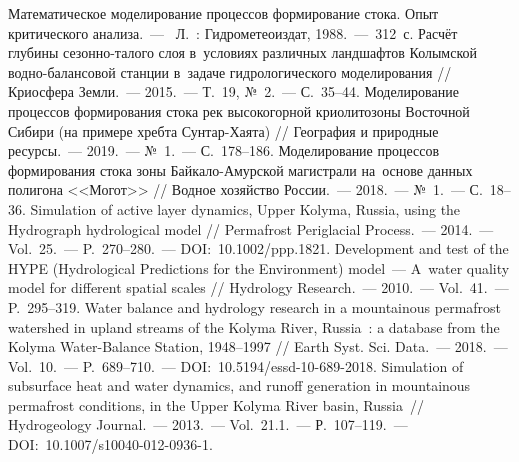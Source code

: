 \begin{thebibliography}{99}
\bibitem{} Математическое моделирование процессов формирование стока. Опыт критического анализа.~---  Л.~: Гидрометеоиздат, 1988.~--- 312~с.
\bibitem{} Расчёт глубины сезонно-талого слоя в~условиях различных ландшафтов Колымской водно-балансовой станции в~задаче гидрологического моделирования // Криосфера Земли.~--- 2015.~--- Т.~19, №~2.~--- С.~35--44.
\bibitem{} Моделирование процессов формирования стока рек высокогорной криолитозоны Восточной Сибири (на примере хребта Сунтар-Хаята) // География и природные ресурсы.~--- 2019.~--- №~1.~--- С.~178--186.
\bibitem{} Моделирование процессов формирования стока зоны Байкало-Амурской магистрали на~основе данных полигона <<Могот>> // Водное хозяйство России.~--- 2018.~--- №~1.~--- С.~18--36.
\bibitem{} Simulation of active layer dynamics, Upper Kolyma, Russia, using the Hydrograph hydrological model // Permafrost Periglacial Process.~--- 2014.~--- Vol.~25.~--- P.~270--280.~--- DOI:~10.1002/ppp.1821.
\bibitem{} Development and test of the HYPE (Hydrological Predictions for the Environment) model~--- A~water quality model for different spatial scales // Hydrology Research.~--- 2010.~--- Vol.~41.~--- P.~295--319.
\bibitem{} Water balance and hydrology research in a mountainous permafrost watershed in upland streams of the Kolyma River, Russia~: a database from the Kolyma Water-Balance Station, 1948--1997 // Earth Syst. Sci. Data.~--- 2018.~--- Vol.~10.~--- P.~689--710.~--- DOI:~10.5194/essd-10-689-2018.
\bibitem{} Simulation of subsurface heat and water dynamics, and runoff generation in mountainous permafrost conditions, in the Upper Kolyma River basin, Russia~// Hydrogeology Journal.~--- 2013.~--- Vol.~21.1.~--- Р.~107--119.~--- DOI:~10.1007/s10040-012-0936-1.

\end{thebibliography}
